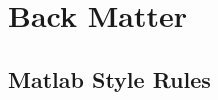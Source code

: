 \documentclass{tufte-book}
\theoremstyle{break}
\let\oldchapter\chapter
\def\chapter{%
  \setcounter{footnote}{0}%
  \oldchapter
}
\begin{document}


\part{Back Matter}
\backmatter





\appendix
\appendixpage
\noappendicestocpagenum
\addappheadtotoc



\chapter{Matlab Style Rules}
\end{document}

